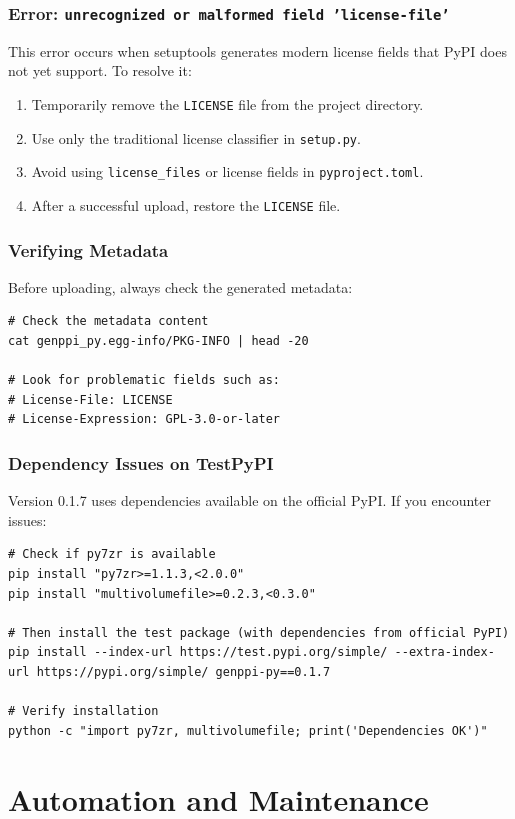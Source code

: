 \documentclass[11pt, a4paper]{article}
\begin{document}
\subsubsection{Error: \texttt{unrecognized or malformed field 'license-file'}}
This error occurs when setuptools generates modern license fields that PyPI does not yet support. To resolve it:
\begin{enumerate}
    \item Temporarily remove the \texttt{LICENSE} file from the project directory.
    \item Use only the traditional license classifier in \texttt{setup.py}.
    \item Avoid using \texttt{license\_files} or license fields in \texttt{pyproject.toml}.
    \item After a successful upload, restore the \texttt{LICENSE} file.
\end{enumerate}

\subsubsection{Verifying Metadata}
Before uploading, always check the generated metadata:
\begin{lstlisting}[style=bashstyle]
# Check the metadata content
cat genppi_py.egg-info/PKG-INFO | head -20

# Look for problematic fields such as:
# License-File: LICENSE
# License-Expression: GPL-3.0-or-later
\end{lstlisting}

\subsubsection{Dependency Issues on TestPyPI}
Version 0.1.7 uses dependencies available on the official PyPI. If you encounter issues:
\begin{lstlisting}[style=bashstyle]
# Check if py7zr is available
pip install "py7zr>=1.1.3,<2.0.0"
pip install "multivolumefile>=0.2.3,<0.3.0"

# Then install the test package (with dependencies from official PyPI)
pip install --index-url https://test.pypi.org/simple/ --extra-index-url https://pypi.org/simple/ genppi-py==0.1.7

# Verify installation
python -c "import py7zr, multivolumefile; print('Dependencies OK')"
\end{lstlisting}

\section{Automation and Maintenance}
\end{document}
